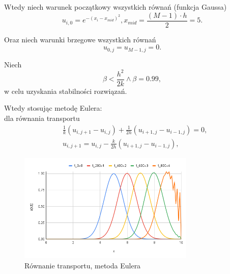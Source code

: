 \documentclass[12pt, a4paper]{article}
\begin{document}
Wtedy niech warunek początkowy wszystkich równań (funkcja Gaussa)
\begin{equation}
u_{i,0}=e^{-(x_{i}-x_{mid})^{2}}, x_{mid}=\frac{(M - 1) \cdot h}{2}=5.
\end{equation}

Oraz niech warunki brzegowe wszystkich równań
\begin{equation}
u_{0,j}=u_{M-1,j}=0.
\end{equation}

Niech 
\begin{equation}
\beta<\frac{h^{2}}{2k}\land\beta=0.99,
\end{equation}
w celu uzyskania stabilności rozwiązań.
\newpage

Wtedy stosując metodę Eulera:\\
dla równania transportu
\begin{equation}
\begin{split}
& \frac{1}{k}(u_{i,j+1}-u_{i,j})+\frac{1}{2h}(u_{i+1,j}-u_{i-1,j})=0,\\
& u_{i,j+1}=u_{i,j}-\frac{k}{2h}(u_{i+1,j}-u_{i-1,j}),
\end{split}
\end{equation}
\begin{figure}[h]
\caption{Równanie transportu, metoda Eulera}
\centering
\includegraphics[width=0.75\textwidth]{0}
\end{figure}
\end{document}
